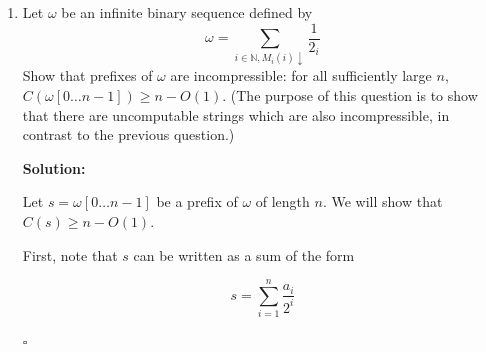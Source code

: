\documentclass[10pt]{article}
\newenvironment{solution}{\textbf{Solution:}}{\hfill$\square$}
\begin{document}
\begin{enumerate}
\begin{solution}
    Let $X_H[0 \ldots n - 1]$ be a prefix of $X_H$ and let $i$ be the index output by our program. We claim that $M_i$ halts on an input of length at most $n$ and runs for exactly $p_i$ steps before halting. Suppose, for the sake of contradiction, that $M_i$ halts on an input of length at most $n$ but does not run for exactly $p_i$ steps before halting. Then there exists an input $x$ of length at most $n$ on which $M_i$ halts and runs for fewer than $p_i$ steps, or $M_i$ does not halt on any input of length at most $n$.
    
    If $M_i$ halts on $x$ and runs for fewer than $p_i$ steps, then the output of $M_i$ on $x$ can be computed in fewer than $p_i$ steps, which contradicts the definition of $p_i$. Therefore, $M_i$ does not halt on any input of length at most $n$. But then $X_H[0 \ldots n - 1]$ does not contain the $i^{th}$ bit of $X_H$, which is 1 if and only if $M_i$ halts on some input. This contradicts the fact that $i$ was output by our program.
    
    Therefore, our program correctly outputs the index $i$ of a Turing machine that halts on an input of length at most $n$ and runs for exactly $p_i$ steps before halting. The size of the output is $O(\log p_i)$. Since each $p_i$ is at most exponential in $k$, the size of the output is $O(\log k)$.
    
    Thus, the prefix $X_H[0 \ldots n - 1]$ is compressible to $O(\log n + O(1))$ bits, as required.


        
    \end{solution}
    \newpage

    \item Let $\omega$ be an infinite binary sequence defined by
    \[\omega=\sum_{i\in \mathbb{N}, M_i(i)\downarrow}\frac{1}{2_i}\]
    Show that prefixes of $\omega$ are incompressible: for all sufficiently large $n$, $C(\omega[0 \ldots n - 1]) \geq n-O(1)$. (The purpose of this question is to show that there are uncomputable strings which are also incompressible, in contrast to the previous question.)

    \begin{solution}

    Let $s=\omega[0 \ldots n-1]$ be a prefix of $\omega$ of length $n$. We will show that $C(s) \geq n-O(1)$.
    
    First, note that $s$ can be written as a sum of the form
    
    \[s = \sum_{i=1}^n \frac{a_i}{2^i}\]
    

\end{solution}
\end{enumerate}
\end{document}
